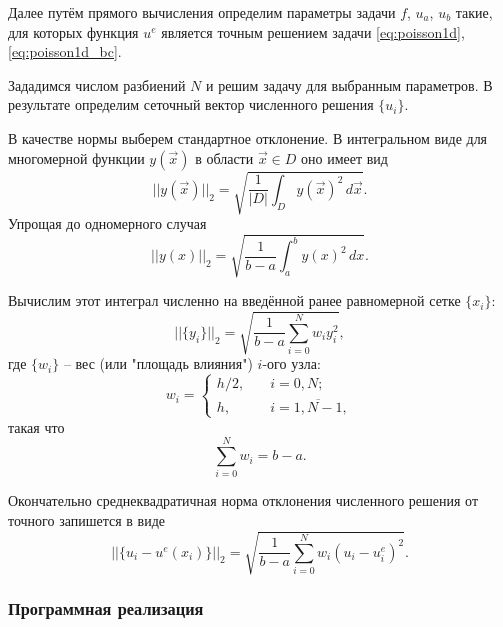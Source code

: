 Далее путём прямого вычисления определим параметры задачи $f$, $u_a$, $u_b$ такие,
для которых функция $u^e$ является точным решением задачи \eqref{eq:poisson1d}, \eqref{eq:poisson1d_bc}.

Зададимся числом разбиений $N$ и решим задачу для выбранным параметров.
В результате определим сеточный вектор численного решения $\{u_i\}$.

В качестве нормы выберем стандартное отклонение. В интегральном виде для многомерной функции $y(\vec x)$
в области $\vec x\in D$ оно имеет вид
\begin{equation}
    \label{eq:norm2_common}
    ||y(\vec x)||_2 = \sqrt{\frac{1}{|D|}\int_{D} y(\vec x)^2 \, d\vec x}.
\end{equation}
Упрощая до одномерного случая
\begin{equation*}
    ||y(x)||_2 = \sqrt{\frac{1}{b-a}\int_{a}^{b} y(x)^2 \, dx}.
\end{equation*}

Вычислим этот интеграл численно на введённой ранее равномерной сетке $\{x_i\}$:
\begin{equation*}
    ||\{y_i\}||_2 = \sqrt{\frac{1}{b-a}\sum_{i=0}^{N} w_i y_i^2},
\end{equation*}
где $\{w_i\}$ -- вес (или "площадь влияния") $i$-ого узла:
\begin{equation*}
    w_i = \begin{cases}
        h/2, &\quad i=0, N;\\
        h, &\quad i=\overline{1,N-1},
    \end{cases}
\end{equation*}
такая что
\begin{equation*}
    \sum_{i=0}^{N} w_i = b-a.
\end{equation*}

Окончательно среднеквадратичная норма отклонения численного решения от точного запишется в виде
\begin{equation}
    \label{eq:poisson1d_fdm_norm}
    ||\{u_i - u^e(x_i)\}||_2 = \sqrt{\frac{1}{b-a}\sum_{i=0}^{N} w_i \left(u_i - u^e_i\right)^2}.
\end{equation}

\subsubsection{Программная реализация}
\label{sec:poisson1d_prog}


